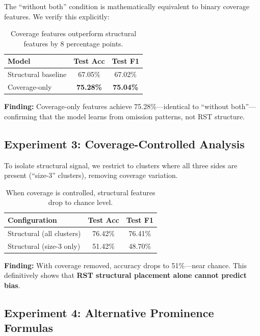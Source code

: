\documentclass[11pt]{article}
\begin{document}
The ``without both'' condition is mathematically equivalent to binary coverage features. We verify this explicitly:

\begin{table}[h]
\centering
\small
\begin{tabular}{lcc}
\toprule
\textbf{Model} & \textbf{Test Acc} & \textbf{Test F1} \\
\midrule
Structural baseline & 67.05\% & 67.02\% \\
Coverage-only & \textbf{75.28\%} & \textbf{75.04\%} \\
\bottomrule
\end{tabular}
\caption{Coverage features outperform structural features by 8 percentage points.}
\label{tab:coverage_baseline}
\end{table}

\textbf{Finding:} Coverage-only features achieve 75.28\%---identical to ``without both''---confirming that the model learns from omission patterns, not RST structure.

\subsection{Experiment 3: Coverage-Controlled Analysis}

To isolate structural signal, we restrict to clusters where all three sides are present (``size-3'' clusters), removing coverage variation.

\begin{table}[h]
\centering
\small
\begin{tabular}{lcc}
\toprule
\textbf{Configuration} & \textbf{Test Acc} & \textbf{Test F1} \\
\midrule
Structural (all clusters) & 76.42\% & 76.41\% \\
Structural (size-3 only) & 51.42\% & 48.70\% \\
\bottomrule
\end{tabular}
\caption{When coverage is controlled, structural features drop to chance level.}
\label{tab:size3_ablation}
\end{table}

\textbf{Finding:} With coverage removed, accuracy drops to 51\%---near chance. This definitively shows that \textbf{RST structural placement alone cannot predict bias}.

\subsection{Experiment 4: Alternative Prominence Formulas}
\end{document}
